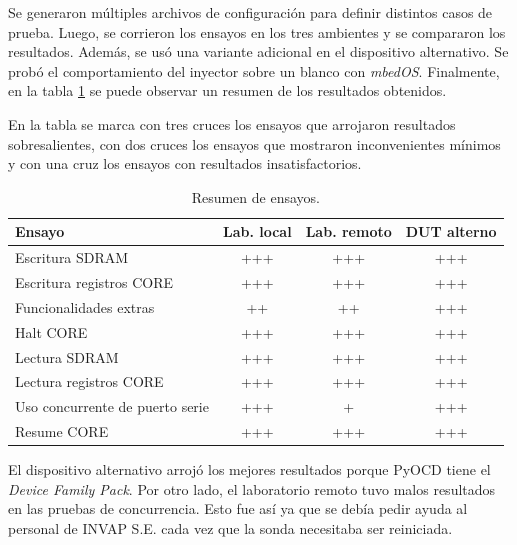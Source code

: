 Se generaron múltiples archivos de configuración para definir distintos casos de prueba.
Luego, se corrieron los ensayos en los tres ambientes y se compararon los resultados.
Además, se usó una variante adicional en el dispositivo alternativo.
Se probó el comportamiento del inyector sobre un blanco con \emph{mbedOS}.
Finalmente, en la tabla \ref{tab:resensayos} se puede observar un resumen de los resultados obtenidos.

En la tabla se marca con tres cruces los ensayos que arrojaron resultados sobresalientes, con dos cruces los ensayos que mostraron inconvenientes mínimos y con una cruz los ensayos con resultados insatisfactorios.

\begin{table}[h]
	\centering
	\caption[Resumen de ensayos]{Resumen de ensayos.}

	\begin{tabular}{l c c c}    
		\toprule
        \textbf{Ensayo}                 & \textbf{Lab. local} & \textbf{Lab. remoto} & \textbf{DUT alterno} \\
		\midrule
		Escritura SDRAM                 & +++                 & +++                  & +++ \\
		Escritura registros CORE        & +++                 & +++                  & +++ \\
		Funcionalidades extras          & ++                  & ++                   & +++ \\
		Halt CORE                       & +++                 & +++                  & +++ \\
		Lectura SDRAM                   & +++                 & +++                  & +++ \\
		Lectura registros CORE          & +++                 & +++                  & +++ \\		
		Uso concurrente de puerto serie & +++                 & +                    & +++ \\
        Resume CORE                     & +++                 & +++                  & +++ \\
		\bottomrule
		\hline
	\end{tabular}
	\label{tab:resensayos}
\end{table}

El dispositivo alternativo arrojó los mejores resultados porque PyOCD tiene el \emph{Device Family Pack}.
Por otro lado, el laboratorio remoto tuvo malos resultados en las pruebas de concurrencia.
Esto fue así ya que se debía pedir ayuda al personal de INVAP S.E. cada vez que la sonda necesitaba ser reiniciada. 


